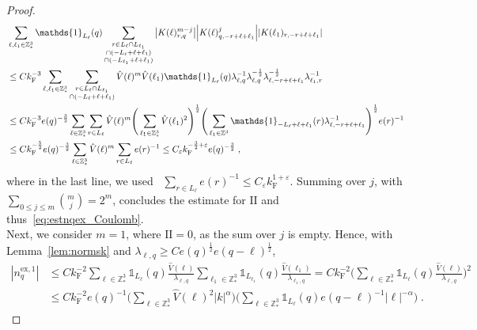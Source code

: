 \documentclass[12pt,a4paper]{article}
\numberwithin{equation}{section}
\newcommand{\1}{\mathbb{I}}
\newcommand{\ex}{\mathrm{ex}}
\newcommand{\F}{\mathrm{F}}
\newcommand{\II}{\mathrm{II}}
\newcommand{\Z}{\mathbb{Z}}
\newcommand{\half}{\frac{1}{2}}
\theoremstyle{plain}
\theoremstyle{definition}
\theoremstyle{remark}
\theoremstyle{plain}
\theoremstyle{definition}
\theoremstyle{remark}
\begin{document}
\begin{proof}
\begin{align}
	&\sum_{\ell,\ell_1 \in \Z^3_*}
		\mathds{1}_{L_\ell}(q)
		\sum_{\substack{r\in L_{\ell} \cap L_{\ell_1}\\ \cap (-L_{\ell}+\ell+\ell_1) \\ \cap (-L_{\ell_1}+\ell+\ell_1 )}}
		\abs{K(\ell)^{m-j}_{r,q}}
		\abs{K(\ell)^j_{q,-r+\ell+\ell_1}}
		\abs{K(\ell_1)_{r,-r+\ell+\ell_1}} \nonumber\\
	&\leq C k_{\F}^{-3} \sum_{\ell,\ell_1 \in \Z^3_*} \sum_{\substack{r \in L_\ell \cap L_{\ell_1} \\ \cap (-L_{\ell}+\ell+\ell_1)}}
		\hat{V}(\ell)^m \hat{V}(\ell_1)
		\mathds{1}_{L_\ell}(q)
		\lambda_{\ell,q}^{-1} \lambda_{\ell,q}^{-\half} \lambda_{\ell,-r+\ell+\ell_1}^{-\half} \lambda_{\ell_1,r}^{-1} \nonumber\\
	&\leq C k_{\F}^{-3} e(q)^{-\frac 32} \sum_{\ell \in \Z^3_*} \sum_{r \in L_\ell}
		\hat{V}(\ell)^m
		\Bigg( \sum_{\ell_1 \in \Z^3_*} \hat{V}(\ell_1)^2  \Bigg)^{\half}
		\Bigg( \sum_{\ell_1 \in \Z^3} \mathds{1}_{-L_{\ell}+\ell+\ell_1}(r) \lambda_{\ell,-r+\ell+\ell_1}^{-1} \Bigg)^{\half}
		 e(r)^{-1} \nonumber\\
	&\leq C k_{\F}^{-\frac 52} e(q)^{-\frac 32} \sum_{\ell \in \Z^3_*} \hat{V}(\ell)^m
	\sum_{r \in L_\ell} e(r)^{-1}
	\leq C_\varepsilon k_{\F}^{-\frac 32 + \varepsilon} e(q)^{-\frac 32} \;,
\end{align}
where in the last line, we used~\cite[Lemma~3.2]{CHN24} $ \sum_{r \in L_\ell} e(r)^{-1} \le C_\varepsilon k_{\F}^{1+\varepsilon} $. Summing over $ j $, with $ \sum_{0 \le j \le m} {{m}\choose j} = 2^m $, concludes the estimate for $ \II $ and thus~\eqref{eq:estnqex_Coulomb}.\\
Next, we consider $ m = 1 $, where $ \II = 0 $, as the sum over $ j $ is empty. Hence, with Lemma~\ref{lem:normsk} and $ \lambda_{\ell,q} \ge C e(q)^{\half} e(q-\ell)^{\half} $,
\begin{align}
	|n_q^{\ex,1}|
	&\leq C k_{\F}^{-2}
		\sum_{\ell \in \Z^3_*} \mathds{1}_{L_\ell}(q) \frac{\hat{V}(\ell)}{\lambda_{\ell,q}}
		\sum_{\ell_1 \in \Z^3_*} \mathds{1}_{L_{\ell_1}}(q) \frac{\hat{V}(\ell_1)}{\lambda_{\ell_1,q}}
	= C k_{\F}^{-2}
		\Bigg( \sum_{\ell \in \Z^3_*} \mathds{1}_{L_\ell}(q) \frac{\hat{V}(\ell)}{\lambda_{\ell,q}} \Bigg)^2 \nonumber\\
	&\leq C k_{\F}^{-2} e(q)^{-1}
		\Bigg( \sum_{\ell \in \Z^3_*} \hat{V}(\ell)^2 |k|^{\alpha} \Bigg)
		\Bigg( \sum_{\ell \in \Z^3_*} \mathds{1}_{L_\ell}(q) e(q-\ell)^{-1} |\ell|^{-\alpha} \Bigg) \;.
\end{align}

\end{proof}
\end{document}
